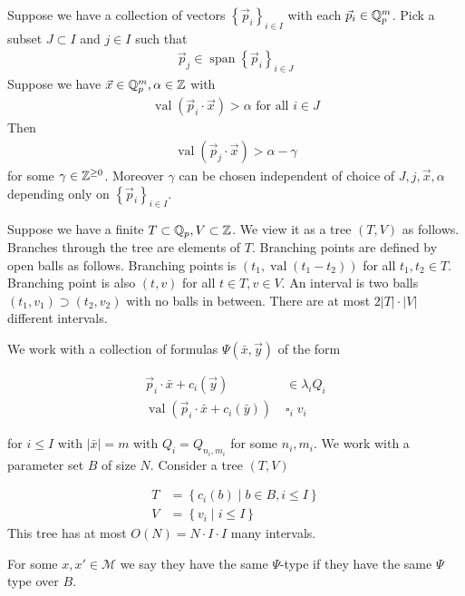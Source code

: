\documentclass{amsart}
\newcommand{\M}{\mathcal M}
\newcommand{\curly}[1]{\left\{#1\right\}}
\DeclareMathOperator{\vecspan}{span}
\DeclareMathOperator{\val}{val}
\begin{document}
\begin{Claim}
	Suppose we have a collection of vectors $\curly{\vec p_i}_{i \in I}$ with each $\vec p_i \in \mathbb{Q}_p^m$.
	Pick a subset $J \subset I$ and $j \in I$ such that
	\begin{align*}
		\vec p_j \in \vecspan \curly{\vec p_i}_{i \in J}
	\end{align*}
	Suppose we have $\vec x \in \mathbb{Q}_p^m, \alpha \in \mathbb{Z}$ with
	\begin{align*}
		\val(\vec p_i \cdot \vec x) > \alpha \text{ for all } i \in J
	\end{align*}
	Then
	\begin{align*}
		\val(\vec p_j \cdot \vec x) > \alpha - \gamma
	\end{align*}
	for some $\gamma \in \mathbb{Z}^{\geq 0}$.
	Moreover $\gamma$ can be chosen independent of choice of $J, j, \vec x, \alpha$ depending only on $\curly{\vec p_i}_{i \in I}$.
\end{Claim}

Suppose we have a finite $T \subset \mathbb{Q}_p, V \subset \mathbb{Z}$.
We view it as a tree $(T, V)$ as follows.
Branches through the tree are elements of $T$.
Branching points are defined by open balls as follows.
Branching points is $(t_1, \val(t_1 - t_2))$ for all $t_1, t_2 \in T$.
Branching point is also $(t, v)$ for all $t \in T, v \in V$.
An interval is two balls $(t_1, v_1) \supset (t_2, v_2)$ with no balls in between.
There are at most $2|T| \cdot |V|$ different intervals.

We work with a collection of formulas $\Psi(\bar x, \vec y)$ of the form

\begin{align*}
	\vec p_i \cdot \bar x + c_i(\vec y) &\in \lambda_i Q_i \\
	\val(\vec p_i \cdot \bar x + c_i(\bar y)) \; &\square_i \; v_i
\end{align*}

for $i \leq I$ with $|\bar x| = m$ with $Q_i = Q_{n_i, m_i}$ for some $n_i, m_i$.
We work with a parameter set $B$ of size $N$.
Consider a tree $(T, V)$

\begin{align*}
	T &= \curly{c_i(b) \mid b \in B, i \leq I} \\
	V &= \curly{v_i \mid i \leq I}
\end{align*}
This tree has at most $O(N) = N \cdot I \cdot I$ many intervals.

For some $x, x' \in \M$ we say they have the same $\Psi$-type if they have the same $\Psi$ type over $B$.
\end{document}
